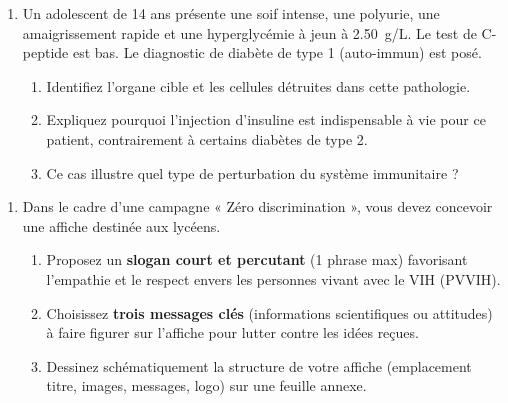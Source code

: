 \documentclass[11pt]{article}
\begin{document}
\begin{exercice}
\begin{enumerate}
    \item Un adolescent de 14 ans présente une soif intense, une polyurie, une amaigrissement rapide et une hyperglycémie à jeun à \SI{2.50}{g/L}. Le test de C-peptide est bas. Le diagnostic de diabète de type 1 (auto-immun) est posé.
    \begin{enumerate}
        \item Identifiez l'organe cible et les cellules détruites dans cette pathologie.
        \item Expliquez pourquoi l'injection d'insuline est indispensable à vie pour ce patient, contrairement à certains diabètes de type 2.
        \item Ce cas illustre quel type de perturbation du système immunitaire ?
    \end{enumerate}
\end{enumerate}
\end{exercice}

\begin{exercice}
\begin{enumerate}
    \item Dans le cadre d'une campagne « Zéro discrimination », vous devez concevoir une affiche destinée aux lycéens.
    \begin{enumerate}
        \item Proposez un \textbf{slogan court et percutant} (1 phrase max) favorisant l'empathie et le respect envers les personnes vivant avec le VIH (PVVIH).
        \item Choisissez \textbf{trois messages clés} (informations scientifiques ou attitudes) à faire figurer sur l'affiche pour lutter contre les idées reçues.
        \item Dessinez schématiquement la structure de votre affiche (emplacement titre, images, messages, logo) sur une feuille annexe.
    \end{enumerate}
\end{enumerate}
\end{exercice}
\end{document}
